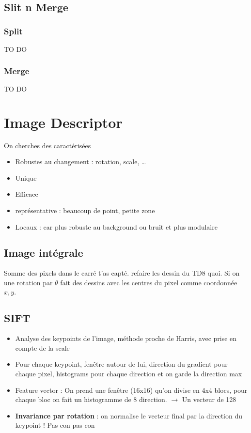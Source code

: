 \documentclass{article}
\theoremstyle{plain}%
\theoremstyle{definition}
\theoremstyle{remark}
\begin{document}
\subsection{Slit n Merge}
\subsubsection{Split}
TO DO
\subsubsection{Merge}
TO DO

\section{Image Descriptor}
On cherches des caractérisées \begin{itemize}
    \item Robustes au changement : rotation, scale, \dots
    \item Unique
    \item Efficace
    \item représentative : beaucoup de point, petite zone
    \item Locaux : car plus robuste au background ou bruit et plus modulaire
\end{itemize}
\subsection{Image intégrale}
Somme des pixels dans le carré t'as capté. refaire les dessin du TD8 quoi. Si on une rotation par $ \theta  $ fait des dessins avec les centres du pixel comme coordonnée $ x,y $.

\subsection{SIFT}
\begin{itemize}
    \item Analyse des keypoints de l'image, méthode proche de Harris, avec prise en compte de la scale
    \item Pour chaque keypoint, fenêtre autour de lui,  direction du gradient pour chaque pixel, histograms pour chaque direction et on garde la direction max
    \item Feature vector : On prend une fenêtre (16x16) qu'on divise en 4x4 blocs, pour chaque bloc on fait un histogramme de 8 direction. $\rightarrow$ Un vecteur de 128 
    \item \textbf{Invariance par rotation} : on normalise le vecteur final par la direction du keypoint ! Pas con pas con
\end{itemize}
\end{document}
